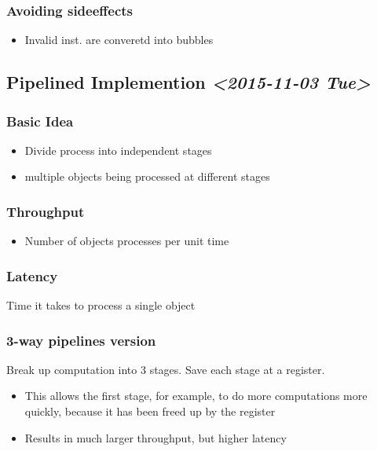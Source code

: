 \documentclass[11pt]{article}
\begin{document}
\subsubsection{Avoiding sideeffects}
\label{sec:orgheadline24}
\begin{itemize}
\item Invalid inst. are converetd into bubbles
\end{itemize}

\subsection{Pipelined Implemention \textit{<2015-11-03 Tue>}}
\label{sec:orgheadline60}
\subsubsection{Basic Idea}
\label{sec:orgheadline26}
\begin{itemize}
\item Divide process into independent stages
\item multiple objects being processed at different stages
\end{itemize}
\subsubsection{Throughput}
\label{sec:orgheadline27}
\begin{itemize}
\item Number of objects processes per unit time
\end{itemize}
\subsubsection{Latency}
\label{sec:orgheadline28}
Time it takes to process a single object

\subsubsection{3-way pipelines version}
\label{sec:orgheadline29}
Break up computation into 3 stages. Save each stage at a register.
\begin{itemize}
\item This allows the first stage, for example, to do more computations more quickly, because it has been freed up by the register
\item Results in much larger throughput, but higher latency
\end{itemize}
\end{document}
